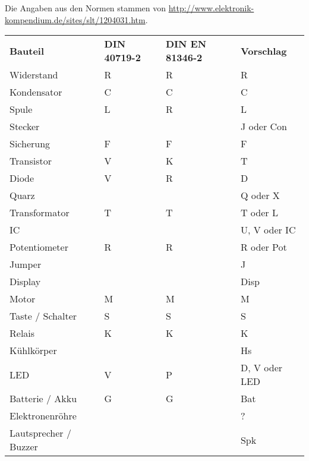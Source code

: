 Die Angaben aus den Normen stammen von 
\url{http://www.elektronik-kompendium.de/sites/slt/1204031.htm}. 
\begin{table}[h!]
  \begin{tabular}{llll}
  \rowcolor{white}  \textbf{Bauteil} 	    
  & \textbf{DIN 40719-2} & \textbf{DIN EN 81346-2}          & \textbf{Vorschlag}\\
  \rowcolor{lgray}  Widerstand              & R     & R     & R \\
  \rowcolor{white}  Kondensator             & C     & C     & C \\
  \rowcolor{lgray}  Spule                   & L     & R     & L \\
  \rowcolor{white}  Stecker                 &       &       & J oder Con \\
  \rowcolor{lgray}  Sicherung               & F     & F     & F \\
  \rowcolor{white}  Transistor              & V     & K     & T \\
  \rowcolor{lgray}  Diode                   & V     & R     & D \\
  \rowcolor{white}  Quarz                   &       &       & Q oder X \\
  \rowcolor{lgray}  Transformator           & T     & T     & T oder L \\
  \rowcolor{white}  IC                      &       &       & U, V oder IC \\
  \rowcolor{lgray}  Potentiometer           & R     & R     & R oder Pot \\
  \rowcolor{white}  Jumper                  &       &       & J \\
  \rowcolor{lgray}  Display                 &       &       & Disp \\
  \rowcolor{white}  Motor                   & M     & M     & M \\
  \rowcolor{lgray}  Taste / Schalter        & S     & S     & S \\
  \rowcolor{white}  Relais                  & K     & K     & K \\
  \rowcolor{lgray}  Kühlkörper              &       &       & Hs \\
  \rowcolor{white}  LED                     & V     & P     & D, V oder LED \\
  \rowcolor{lgray}  Batterie / Akku         & G     & G     & Bat \\
  \rowcolor{white}  Elektronenröhre         &       &       & ? \\
  \rowcolor{lgray}  Lautsprecher / Buzzer   &       &       & Spk \\

\end{tabular}
\end{table}
